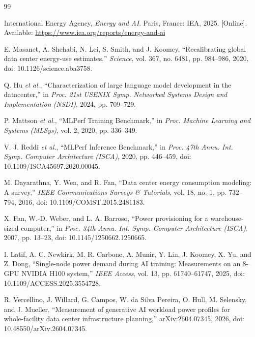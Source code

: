 \begin{thebibliography}{99}

\label{ref:1}
International Energy Agency, \emph{Energy and AI}. Paris, France: IEA, 2025. [Online]. Available: \url{https://www.iea.org/reports/energy-and-ai}

\label{ref:2}
E. Masanet, A. Shehabi, N. Lei, S. Smith, and J. Koomey, ``Recalibrating global data center energy-use estimates,'' \emph{Science}, vol. 367, no. 6481, pp. 984--986, 2020, doi: 10.1126/science.aba3758.

\label{ref:3}
Q. Hu \emph{et al.}, ``Characterization of large language model development in the datacenter,'' in \emph{Proc. 21st USENIX Symp. Networked Systems Design and Implementation (NSDI)}, 2024, pp. 709--729.

\label{ref:4}
P. Mattson \emph{et al.}, ``MLPerf Training Benchmark,'' in \emph{Proc. Machine Learning and Systems (MLSys)}, vol. 2, 2020, pp. 336--349.

\label{ref:5}
V. J. Reddi \emph{et al.}, ``MLPerf Inference Benchmark,'' in \emph{Proc. 47th Annu. Int. Symp. Computer Architecture (ISCA)}, 2020, pp. 446--459, doi: 10.1109/ISCA45697.2020.00045.

\label{ref:6}
M. Dayarathna, Y. Wen, and R. Fan, ``Data center energy consumption modeling: A survey,'' \emph{IEEE Communications Surveys \& Tutorials}, vol. 18, no. 1, pp. 732--794, 2016, doi: 10.1109/COMST.2015.2481183.

\label{ref:7}
X. Fan, W.-D. Weber, and L. A. Barroso, ``Power provisioning for a warehouse-sized computer,'' in \emph{Proc. 34th Annu. Int. Symp. Computer Architecture (ISCA)}, 2007, pp. 13--23, doi: 10.1145/1250662.1250665.

\label{ref:8}
I. Latif, A. C. Newkirk, M. R. Carbone, A. Munir, Y. Lin, J. Koomey, X. Yu, and Z. Dong, ``Single-node power demand during AI training: Measurements on an 8-GPU NVIDIA H100 system,'' \emph{IEEE Access}, vol. 13, pp. 61740--61747, 2025, doi: 10.1109/ACCESS.2025.3554728.

\label{ref:9}
R. Vercellino, J. Willard, G. Campos, W. da Silva Pereira, O. Hull, M. Selensky, and J. Mueller, ``Measurement of generative AI workload power profiles for whole-facility data center infrastructure planning,'' arXiv:2604.07345, 2026, doi: 10.48550/arXiv.2604.07345.


\end{thebibliography}
